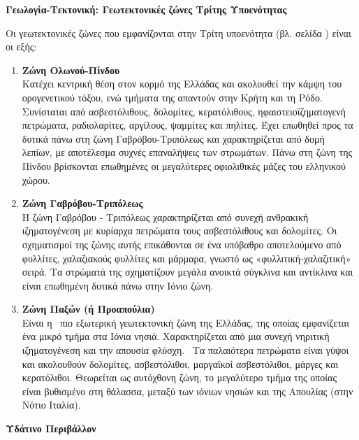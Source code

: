 \documentclass[12pt]{article}
\begin{document}
	\textbf{Γεωλογία-Τεκτονική: Γεωτεκτονικές ζώνες Τρίτης Υποενότητας}
	
	Οι γεωτεκτονικές ζώνες που εμφανίζονται στην Τρίτη υποενότητα (βλ. σελίδα \pageref{geotektonikes}) είναι οι εξής:
	
	\begin{enumerate}
		\item \textbf{Ζώνη Ολωνού-Πίνδου} \\
		Κατέχει κεντρική θέση στον κορμό της Ελλάδας και ακολουθεί την κάμψη του ορογενετικού τόξου, ενώ τμήματα της απαντούν στην Κρήτη και τη Ρόδο. Συνίσταται από ασβεστόλιθους, δολομίτες, κερατόλιθους, ηφαιστειοϊζηματογενή πετρώματα, ραδιολαρίτες, αργίλους, ψαμμίτες και πηλίτες. Έχει επωθηθεί προς τα δυτικά πάνω στη ζώνη Γαβρόβου-Τριπόλεως και χαρακτηρίζεται από δομή λεπίων, με αποτέλεσμα συχνές επαναλήψεις των στρωμάτων. Πάνω στη ζώνη της Πίνδου βρίσκονται επωθημένες οι μεγαλύτερες οφιολιθικές μάζες του ελληνικού χώρου.
		\item \textbf{Ζώνη Γαβρόβου-Τριπόλεως} \\
		Η ζώνη Γαβρόβου - Τριπόλεως χαρακτηρίζεται από συνεχή ανθρακική ιζηματογένεση με κυρίαρχα πετρώματα τους ασβεστόλιθους και δολομίτες. Οι σχηματισμοί της ζώνης αυτής επικάθονται σε ένα υπόβαθρο αποτελούμενο από φυλλίτες, χαλαζιακούς φυλλίτες και μάρμαρα, γνωστό ως «φυλλιτική-χαλαζιτική» σειρά. Τα στρώματά της σχηματίζουν μεγάλα ανοικτά σύγκλινα και αντίκλινα και είναι επωθημένη δυτικά πάνω στην Ιόνιο ζώνη.
		\item \textbf{Ζώνη Παξών (ή Προαπούλια)} \\
		Είναι η  πιο εξωτερική γεωτεκτονική ζώνη της Ελλάδας, της οποίας εμφανίζεται  ένα μικρό τμήμα στα Ιόνια νησιά. Χαρακτηρίζεται από μια συνεχή νηριτική ιζηματογένεση και την απουσία φλύσχη.  Τα παλαιότερα πετρώματα είναι γύψοι και ακολουθούν δολομίτες, ασβεστόλιθοι, μαργαϊκοί ασβεστόλιθοι, μάργες και κερατόλιθοι. Θεωρείται ως αυτόχθονη ζώνη, το μεγαλύτερο τμήμα της οποίας είναι βυθισμένο στη θάλασσα, μεταξύ των ιόνιων νησιών και της Απουλίας (στην Νότιο Ιταλία).
	\end{enumerate}

	\textbf{Υδάτινο Περιβάλλον}
	
\end{document}
